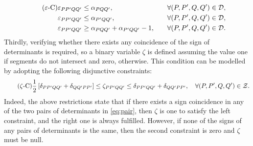 \documentclass[a4paper,  review, authoryear, 1p.]{elsarticle}
\newcommand{\VB}{{V^{}_{\mathcal B}}}
\newcommand{\CV}[1]{{\color{blue}#1}}
\begin{document}
		\CV{
		\begin{align*}\tag{$\varepsilon$-C}\label{eq:varepsilonC}
			\varepsilon_{PP'QQ'} & \leq \alpha_{PQQ'},&\quad\forall (P,P',Q,Q')\in\mathcal D,\\
			\varepsilon_{PP'QQ'} & \leq \alpha_{P'QQ'},&\quad\forall (P,P',Q,Q')\in\mathcal D,\\
			\varepsilon_{PP'QQ'} & \geq \alpha_{PQQ'} + \alpha_{P'QQ'} - 1,&\quad\forall (P,P',Q,Q')\in\mathcal D.
		\end{align*}}
	\newcommand{\zetacheck}[4]{\zeta_{#1#2#3#4}}
	Thirdly, verifying whether there exists any coincidence of the sign of determinants is required, so a binary variable $\zeta$ is defined  assuming the value one if segments do not intersect and zero, otherwise. This condition can be modelled by adopting the following disjunctive constraints:
	\CV{
	\begin{equation*}\tag{$\zeta$-C}\label{eq:zetaC}
		\frac{1}{2}\left[\deltamas{P}{P'}{Q}{Q'}+\deltamas{Q}{Q'}{P}{P'}\right]\leq\zetacheck{P}{P'}{Q}{Q'}\leq \deltamas{P}{P'}{Q}{Q'}+\deltamas{Q}{Q'}{P}{P'},\quad\forall (P,P',Q,Q')\in \mathcal Z.
	\end{equation*}}
	Indeed, the above restrictions state that if there exists a sign coincidence in any of the two pairs of determinants in \eqref{eq:pair}, then $\zeta$ is one to satisfy the left constraint, and the right one is always fulfilled. However, if none of the signs of any pairs of determinants is the same, then the second constraint is zero and $\zeta$ must be null.
	
\end{document}
